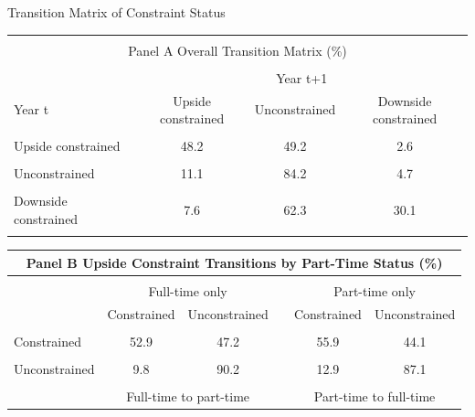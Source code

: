 \begin{center}
\footnotesize
\begin{threeparttable}
\caption{Transition Matrix of Constraint Status} \label{Markov}
\begin{tabular}{lccc}
\hline \hline \\[-1ex]
\multicolumn{4}{c}{Panel A Overall Transition Matrix (\%)} \\
\hline \\[-1ex]
                          & \multicolumn{3}{c}{Year t+1}  \\
Year t                    & Upside constrained &  Unconstrained & Downside constrained \\ \\
Upside constrained        &  48.2              &  49.2          & 2.6                  \\ \\
Unconstrained             &  11.1              &  84.2          & 4.7                  \\ \\
Downside constrained      &  7.6               &  62.3          & 30.1                 \\
\hline \\[-1ex]
\end{tabular}

\begin{tabular}{lccccc}
\multicolumn{6}{c}{Panel B Upside Constraint Transitions by Part-Time Status (\%)} \\
\hline \\[-1ex]
                          & \multicolumn{2}{c}{Full-time only}  && \multicolumn{2}{c}{Part-time only}\\
\cline{2-3} \cline{5-6}

                          & Constrained &  Unconstrained && Constrained & Unconstrained \\ \\
Constrained               &  52.9       &  47.2          && 55.9        & 44.1          \\ \\
Unconstrained             &  9.8        &  90.2          && 12.9        & 87.1          \\ \\

                          & \multicolumn{2}{c}{Full-time to part-time}  && \multicolumn{2}{c}{Part-time to full-time}\\
\cline{2-3} \cline{5-6}


\end{tabular}
\end{threeparttable}
\end{center}
